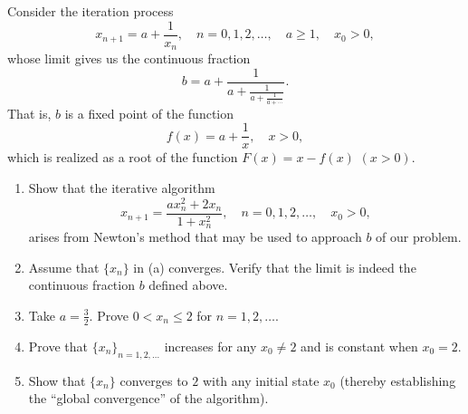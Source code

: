 \begingroup
\renewcommand{\labelenumi}{(\alph{enumi})}
\begin{exercise}
  \label{ex:hw02:newton-iteration}
  Consider the iteration process
  \[
    x_{n+1}=a+\frac{1}{x_n},\quad n=0,1,2,\ldots,
    \quad a\geq 1,\quad x_0>0,
  \]
  whose limit gives us the continuous fraction
  \[
    b=a+\frac{1}{a+\frac{1}{a+\frac{1}{a+\cdots}}}.
  \]
  That is, $b$ is a fixed point of the function
  \[
    f(x)=a+\frac{1}{x},\quad x>0,
  \]
  which is realized as a root of the function $F(x)=x-f(x)$ $(x>0)$.
  \begin{enumerate}
    \item Show that the iterative algorithm
      \[
        x_{n+1}=\frac{ax_n^2+2x_n}{1+x_n^2},
        \quad n=0,1,2,\ldots,\quad x_0>0,
      \]
      arises from Newton's method that may be used to approach $b$ of our problem.
    \item Assume that $\{x_n\}$ in (a) converges.
      Verify that the limit is indeed the continuous fraction $b$ defined above.
    \item Take $a=\frac{3}{2}$. Prove $0<x_n\leq 2$ for $n=1,2,\ldots$.
    \item Prove that $\{x_n\}_{n=1,2,\ldots}$ increases for any $x_0\ne 2$
      and is constant when $x_0=2$.
    \item Show that $\{x_n\}$ converges to $2$ with any initial state $x_0$
      (thereby establishing the ``global convergence'' of the algorithm).
  \end{enumerate}
\end{exercise}
\endgroup
